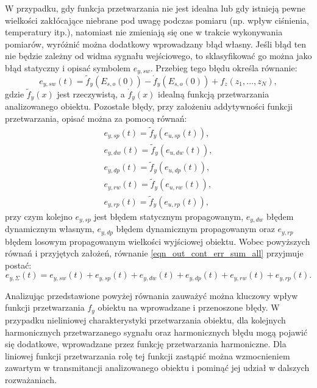 W przypadku, gdy funkcja przetwarzania nie jest idealna lub gdy istnieją pewne wielkości zakłócające niebrane pod uwagę podczas pomiaru (np. wpływ ciśnienia, temperatury itp.), natomiast nie zmieniają się one w trakcie wykonywania pomiarów, wyróżnić można dodatkowy wprowadzany błąd własny. Jeśli błąd ten nie będzie zależny od widma sygnału wejściowego, to sklasyfikować go można jako błąd statyczny i opisać symbolem $e_{y,sw}$. Przebieg tego błędu określa równanie:
\begin{equation}
e_{y,sw}(t) = \tilde{f}_{y} \left( E_{s,o}(0) \right) - \dot{f}_{y} \left( E_{s,o}(0) \right) + f_{z}(z_{1}, \hdots, z_{N}) \label{eqn_out_cont_err_stat_self},
\end{equation}
gdzie $\tilde{f}_{y}(x)$ jest rzeczywistą, a $\dot{f}_{y}(x)$ idealną funkcją przetwarzania analizowanego obiektu. Pozostałe błędy, przy założeniu addytywności funkcji przetwarzania, opisać można za pomocą równań:
\begin{gather}
e_{y,sp}(t) = \tilde{f}_{y} \left( e_{u,sp}(t) \right) \label{eqn_out_cont_err_stat_prop}, \\
e_{y,dw}(t) = \tilde{f}_{y} \left( e_{u,dw}(t) \right) \label{eqn_out_cont_err_dyn_prop}, \\
e_{y,dp}(t) = \tilde{f}_{y} \left( e_{u,dp}(t) \right) \label{eqn_out_cont_err_dyn_self}, \\
e_{y,rw}(t) = \tilde{f}_{y} \left( e_{u,rw}(t) \right) \label{eqn_out_cont_err_rand_self}, \\
e_{y,rp}(t) = \tilde{f}_{y} \left( e_{u,rp}(t) \right) \label{eqn_out_cont_err_rand_prop},
\end{gather}
przy czym kolejno $e_{y,sp}$ jest błędem statycznym propagowanym, $e_{y,dw}$ błędem dynamicznym własnym, $e_{y,dp}$ błędem dynamicznym propagowanym oraz $e_{y,rp}$ błędem losowym propagowanym wielkości wyjściowej obiektu. Wobec powyższych równań i przyjętych założeń, równanie \eqref{eqn_out_cont_err_sum_all} przyjmuje postać:
\begin{equation}
e_{y,\Sigma}(t) = e_{y,sw}(t) + e_{y,sp}(t) + e_{y,dw}(t) + e_{y,dp}(t) + e_{y,rw}(t) + e_{y,rp}(t) \label{eqn_out_cont_err_sum_add}.
\end{equation}

Analizując przedstawione powyżej równania zauważyć można kluczowy wpływ funkcji przetwarzania $f_{y}$ obiektu na wprowadzane i przenoszone błędy. W przypadku nieliniowej charakterystyki przetwarzania obiektu, dla kolejnych harmonicznych przetwarzanego sygnału oraz harmonicznych błędu mogą pojawić się dodatkowe, wprowadzane przez funkcję przetwarzania harmoniczne. Dla liniowej funkcji przetwarzania rolę tej funkcji zastąpić można wzmocnieniem zawartym w transmitancji analizowanego obiektu i pominąć jej udział w dalszych rozważaniach.

